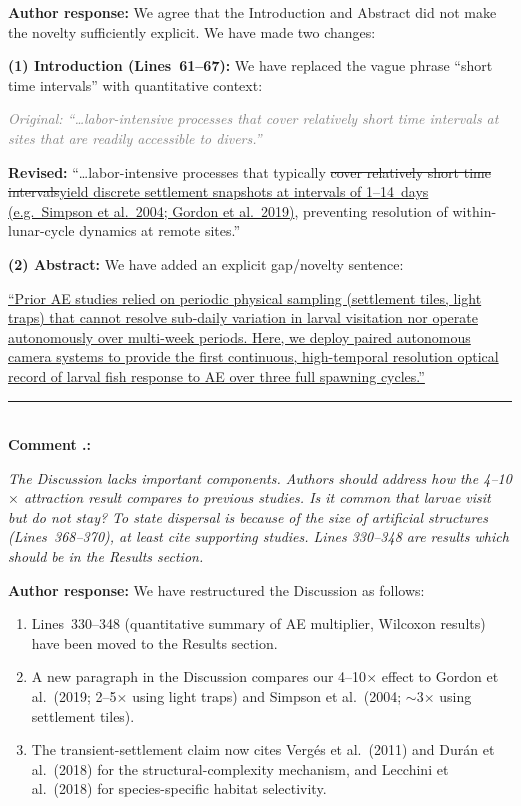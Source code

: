 \documentclass[12pt]{article}
\newcommand{\original}[1]{%
  \textcolor{gray}{\textit{Original: ``#1''}}}
\newcommand{\revised}[1]{%
  \textcolor{addcolor}{\textbf{Revised: }``#1''}}
\newcommand{\added}[1]{\textcolor{addcolor}{\uline{#1}}}
\newcommand{\deleted}[1]{\textcolor{delcolor}{\sout{#1}}}
\newcommand{\authornote}[1]{%
  \par\noindent\textcolor{notecolor}{\textbf{Author response:} #1}\par}
\newenvironment{reviewercomment}{%
  \par\noindent\textcolor{revcolor}\bgroup\itshape}{\egroup\par}
\newcounter{rcounter}[section]
\newcommand{\RC}[1]{%
  \stepcounter{rcounter}%
  \bigskip
  \noindent\rule{\linewidth}{0.4pt}\\[2pt]
  \textbf{Comment \arabic{section}.\arabic{rcounter}:}\\[4pt]
  \begin{reviewercomment}#1\end{reviewercomment}}
\newcommand{\AR}[1]{%
  \authornote{#1}}
\begin{document}
\AR{We agree that the Introduction and Abstract did not make the novelty
sufficiently explicit. We have made two changes:

\textbf{(1) Introduction (Lines~61--67):} We have replaced the vague phrase
``short time intervals'' with quantitative context:

\original{\ldots labor-intensive processes that cover relatively short time
intervals at sites that are readily accessible to divers.}

\revised{\ldots labor-intensive processes that typically \deleted{cover
relatively short time intervals}\added{yield discrete settlement snapshots at
intervals of 1--14~days (e.g.\ Simpson et al.\ 2004; Gordon et al.\ 2019)},
preventing resolution of within-lunar-cycle dynamics at remote sites.}

\textbf{(2) Abstract:} We have added an explicit gap/novelty sentence:

\added{``Prior AE studies relied on periodic physical sampling (settlement
tiles, light traps) that cannot resolve sub-daily variation in larval
visitation nor operate autonomously over multi-week periods. Here, we deploy
paired autonomous camera systems to provide the first continuous, high-temporal
resolution optical record of larval fish response to AE over three full
spawning cycles.''}}

\RC{The Discussion lacks important components. Authors should address how the
4--10$\times$ attraction result compares to previous studies. Is it common that
larvae visit but do not stay? To state dispersal is because of the size of
artificial structures (Lines~368--370), at least cite supporting studies. Lines
330--348 are results which should be in the Results section.}

\AR{We have restructured the Discussion as follows:
\begin{enumerate}[noitemsep]
  \item Lines~330--348 (quantitative summary of AE multiplier, Wilcoxon
    results) have been moved to the Results section.
  \item A new paragraph in the Discussion compares our 4--10$\times$ effect
    to Gordon et al.\ (2019; 2--5$\times$ using light traps) and Simpson et
    al.\ (2004; $\sim$3$\times$ using settlement tiles).
  \item The transient-settlement claim now cites Verg\'es et al.\ (2011) and
    Dur\'an et al.\ (2018) for the structural-complexity mechanism, and
    Lecchini et al.\ (2018) for species-specific habitat selectivity.
\end{enumerate}}
\end{document}
